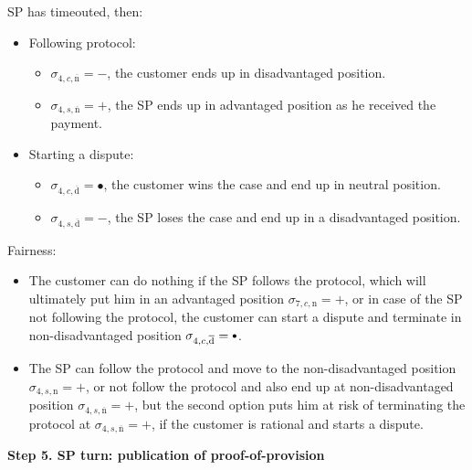 \documentclass{ieeeaccess}
\newcommand\sbullet[1][.75]{\mathbin{\ThisStyle{\vcenter{\hbox{%
  \scalebox{#1}{$\SavedStyle\bullet$}}}}}%
}
\begin{document}
SP has timeouted, then:

\begin{itemize}
\item
  Following protocol:

  \begin{itemize}
  
  \item
    \(\sigma_{4, c, \overline{\mathrm{n}}} = -\), the customer ends up in
    disadvantaged position.
  \item
    \(\sigma_{4, s, \overline{\mathrm{n}}} = +\), the SP ends up in
    advantaged position as he received the payment.
  \end{itemize}
\item
  Starting a dispute:

  \begin{itemize}
  
  \item
    \(\sigma_{4, c, \overline{\mathrm{d}}} = •\), the customer wins the
    case and end up in neutral position.
  \item
    \(\sigma_{4, s, \overline{\mathrm{d}}} = -\), the SP loses the case
    and end up in a disadvantaged position.
  \end{itemize}
\end{itemize}

Fairness:

\begin{itemize}

\item
  The customer can do nothing if the SP follows the protocol, which will
  ultimately put him in an advantaged position
  \(\sigma_{7, c, \mathrm{n}} = +\), or in case of the SP not following
  the protocol, the customer can start a dispute and terminate in
  non-disadvantaged position
  \(\sigma_{4, c, \overline{\mathrm{d}}} = \sbullet\).
\item
  The SP can follow the protocol and move to the non-disadvantaged
  position \(\sigma_{4, s, \mathrm{n}} = +\), or not follow the protocol
  and also end up at non-disadvantaged position
  \(\sigma_{4, s, \overline{\mathrm{n}}} = +\), but the second option
  puts him at risk of terminating the protocol at
  \(\sigma_{4, s, \overline{\mathrm{n}}} = +\), if the customer is
  rational and starts a dispute.
\end{itemize}

\noindent \textbf
{Step 5. SP turn: publication of proof-of-provision}\label{step-5-publication-of-proof-of-provision}
\end{document}
